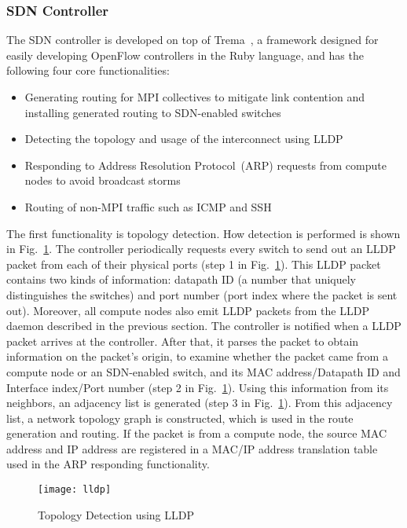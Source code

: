 \subsubsection{SDN Controller}

The SDN controller is developed on top  of Trema~\autocite{trema}, a framework
designed for easily developing OpenFlow controllers in the Ruby language, and
has the following four core functionalities:

\begin{itemize}
\item Generating routing for MPI collectives to mitigate link contention and
    installing generated routing to SDN-enabled switches
\item Detecting the topology and usage of the interconnect using LLDP
\item Responding to Address Resolution Protocol~(ARP) requests from compute
    nodes to avoid broadcast storms
\item Routing of non-MPI traffic such as ICMP and SSH
\end{itemize}

The first functionality is topology detection. How detection is
performed is shown in Fig.~\ref{fig:lldp}. The controller periodically
requests every switch to send out an LLDP packet from each of their physical
ports (step 1 in Fig.~\ref{fig:lldp}). This LLDP packet contains two kinds of
information: datapath ID (a number that uniquely distinguishes the switches)
and port number (port index where the packet is sent out). Moreover, all
compute nodes also emit LLDP packets from the LLDP daemon described in the
previous section. The controller is notified when a LLDP packet arrives at the
controller. After that, it parses the packet to obtain information on the
packet's origin, to examine whether the packet came from a compute node or an
SDN-enabled switch, and its MAC address/Datapath ID and Interface index/Port
number (step 2 in Fig.~\ref{fig:lldp}). Using this information from its
neighbors, an adjacency list is generated (step 3 in Fig.~\ref{fig:lldp}).
From this adjacency list, a network topology graph is constructed, which is
used in the route generation and routing. If the packet is from a compute
node, the source MAC address and IP address are registered in a MAC/IP address
translation table used in the ARP responding functionality.

\begin{figure}
    \centering
    \texttt{[image: lldp]}
    \caption{Topology Detection using LLDP}%
    \label{fig:lldp}
\end{figure}

